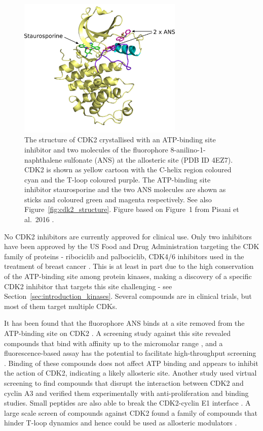 \begin{figure}
\centering

\includegraphics[width=0.7\textwidth]{figures/cdk2_intro/cdk2_intro}

\caption[Structure of CDK2]
{The structure of CDK2 crystallised with an ATP-binding site inhibitor and two molecules of the fluorophore 8-anilino-1-naphthalene sulfonate (ANS) at the allosteric site (PDB ID 4EZ7).
CDK2 is shown as yellow cartoon with the \textalpha C-helix region coloured cyan and the T-loop coloured purple.
The ATP-binding site inhibitor staurosporine and the two ANS molecules are shown as sticks and coloured green and magenta respectively.
See also Figure~\ref{fig:cdk2_structure}.
Figure based on Figure~1 from Pisani et al.\ 2016 \cite{Pisani2016}.}

\label{fig:cdk2_intro}
\end{figure}


No CDK2 inhibitors are currently approved for clinical use.
Only two inhibitors have been approved by the US Food and Drug Administration targeting the CDK family of proteins - ribociclib and palbociclib, CDK4/6 inhibitors used in the treatment of breast cancer \cite{Hortobagyi2016}.
This is at least in part due to the high conservation of the ATP-binding site among protein kinases, making a discovery of a specific CDK2 inhibitor that targets this site challenging - see Section~\ref{sec:introduction_kinases}.
Several compounds are in clinical trials, but most of them target multiple CDKs.

It has been found that the fluorophore ANS binds at a site removed from the ATP-binding site on CDK2 \cite{Betzi2011}.
A screening study against this site revealed compounds that bind with affinity up to the micromolar range \cite{Rastelli2014}, and a fluorescence-based assay has the potential to facilitate high-throughput screening \cite{Martin2012}.
Binding of these compounds does not affect ATP binding and appears to inhibit the action of CDK2, indicating a likely allosteric site.
Another study used virtual screening to find compounds that disrupt the interaction between CDK2 and cyclin A3 \cite{Hu2015} and verified them experimentally with anti-proliferation and binding studies.
Small peptides are also able to break the CDK2-cyclin E1 interface \cite{Chen2014}.
A large scale screen of compounds against CDK2 found a family of compounds that hinder T-loop dynamics and hence could be used as allosteric modulators \cite{Pellerano2017}.


